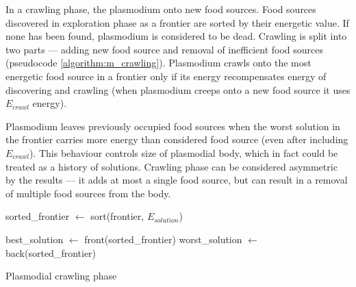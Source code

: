 In a crawling phase, the plasmodium onto new food sources. Food sources discovered in exploration phase as a frontier are sorted by their energetic value. If none has been found, plasmodium is considered to be dead. Crawling is split into two parts --- adding new food source and removal of inefficient food sources (pseudocode \ref{algorithm:m_crawling}). Plasmodium crawls onto the most energetic food source in a frontier only if its energy recompensates energy of discovering and crawling (when plasmodium creeps onto a new food source it uses $E_{crawl}$ energy). 

Plasmodium leaves previously occupied food sources when the worst solution in the frontier carries more energy than considered food source (even after including $E_{crawl}$). This behaviour controls size of plasmodial body, which in fact could be treated as a history of solutions. Crawling phase can be considered asymmetric by the results --- it adds at most a single food source, but can result in a removal of multiple food sources from the body.

\begin{algorithm}
  \BlankLine


  sorted\_frontier $\leftarrow$ sort(frontier, $E_{solution}$)\;

  best\_solution $\leftarrow$ front(sorted\_frontier)\;
  worst\_solution $\leftarrow$ back(sorted\_frontier)\;


  \;

  \caption{Plasmodial crawling phase}
  \label{algorithm:m_crawling}
\end{algorithm}

